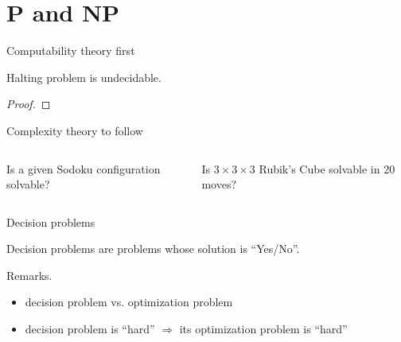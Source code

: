 \section{P and NP}

\begin{frame}{Computability theory first}
  \begin{theorem}{}
    Halting problem is undecidable.
  \end{theorem}

  \begin{proof}
  \end{proof}
\end{frame}
\begin{frame}{Complexity theory to follow}
  \begin{columns}[t]
      Is a given Sodoku configuration solvable?

      Is $3 \times 3 \times 3$ Rubik's Cube solvable in 20 moves?

  \end{columns}
\end{frame}
\begin{frame}{Decision problems}
  \begin{definition}
    Decision problems are problems whose solution is ``Yes/No''.
  \end{definition}

  \begin{alertblock}{Remarks.}
    \begin{itemize}
      \item decision problem vs. optimization problem
      \item decision problem is ``hard'' $\Rightarrow$ its optimization problem is ``hard''
    \end{itemize}
  \end{alertblock}
\end{frame}
